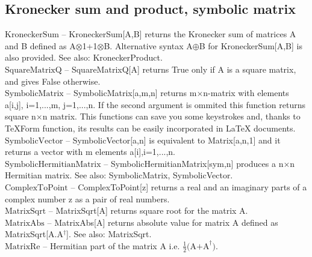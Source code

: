 \subsection{Kronecker sum and product, symbolic matrix}

\noindent\textbf{$ \text{KroneckerSum} $ }-- KroneckerSum[A,B] returns the Kronecker sum of matrices A and B defined as A$\otimes $1+1$\otimes $B. Alternative syntax A$\oplus $B for KroneckerSum[A,B] is also provided. See also: KroneckerProduct.$  $\\[6pt]

\noindent\textbf{$ \text{SquareMatrixQ} $ }-- SquareMatrixQ[A] returns True only if A is a square matrix, and gives False otherwise.$  $\\[6pt]

\noindent\textbf{$ \text{SymbolicMatrix} $ }-- SymbolicMatrix[a,m,n] returns m$\times $n-matrix with elements a[i,j], i=1,...,m, j=1,...,n. If the second argument is ommited this function returns square n$\times $n matrix. This functions can save you some keystrokes and, thanks to TeXForm function, its results can be easily incorporated in LaTeX documents.$  $\\[6pt]

\noindent\textbf{$ \text{SymbolicVector} $ }-- SymbolicVector[a,n] is equivalent to Matrix[a,n,1] and it returns a vector with m elements a[i],i=1,...,n.$  $\\[6pt]

\noindent\textbf{$ \text{SymbolicHermitianMatrix} $ }-- SymbolicHermitianMatrix[sym,n] produces a n$\times $n Hermitian matrix. See also: SymbolicMatrix, SymbolicVector.$  $\\[6pt]

\noindent\textbf{$ \text{ComplexToPoint} $ }-- ComplexToPoint[z] returns a real and an imaginary parts of a complex number z as a pair of real numbers.$  $\\[6pt]

\noindent\textbf{$ \text{MatrixSqrt} $ }-- MatrixSqrt[A] returns square root for the matrix A.$  $\\[6pt]

\noindent\textbf{$ \text{MatrixAbs} $ }-- MatrixAbs[A] returns absolute value for matrix A defined as MatrixSqrt[A.A$  ^{\dagger } $]. See also: MatrixSqrt.$  $\\[6pt]

\noindent\textbf{$ \text{MatrixRe} $ }-- Hermitian part of the matrix A i.e. $ \frac{1}{2}\text{(A+A} ^{\dagger }\text{).} $\\[6pt]

